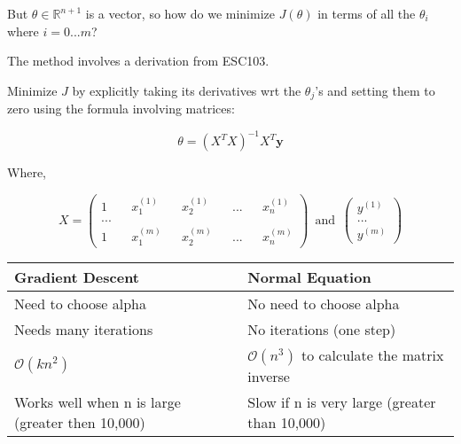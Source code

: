 \documentclass{article}
\begin{document}
\begin{mybox}
    But $\theta \in \mathbb{R}^{n+1}$ is a vector, so how do we minimize $J(\theta)$ in terms of all the $\theta_i$ where $i= 0 ... m$?
    
    The method involves a derivation from ESC103.
    
    Minimize $J$ by explicitly taking its derivatives wrt the $\theta_j$'s and setting them to zero using the formula involving matrices:
    
    \begin{equation}
        \theta = \left(X^T X \right)^{-1} X^T \textbf{y}
    \end{equation}

    Where,
    
    \begin{equation}
        X = \begin{pmatrix}
            1 && x_1^{(1)} && x_2^{(1)} && ... && x_n^{(1)} \\
            ... \\
            1 && x_1^{(m)} && x_2^{(m)} && ... && x_n^{(m)}
        \end{pmatrix}
        \, \, \, \text{and} \, \, \, 
        \begin{pmatrix}
            y^{(1)} \\
            ... \\ 
            y^{(m)}
        \end{pmatrix}
    \end{equation}
\end{mybox}



\begin{table}[h]
\centering
\begin{tabular}{ll} 
\hline
\multicolumn{1}{|l|}{\textbf{Gradient Descent}}  & \multicolumn{1}{l|}{\textbf{Normal Equation}}  \\ 
\hline
Need to choose alpha                             & No need to choose alpha                        \\
Needs many iterations                            & No iterations (one step)                        \\
$\mathcal{O}(kn^2)$                                       & $\mathcal{O}(n^3)$ to calculate the matrix inverse      \\
Works well when n is large (greater then 10,000) & Slow if n is very large (greater than 10,000) 
\end{tabular}
\end{table}
\end{document}
